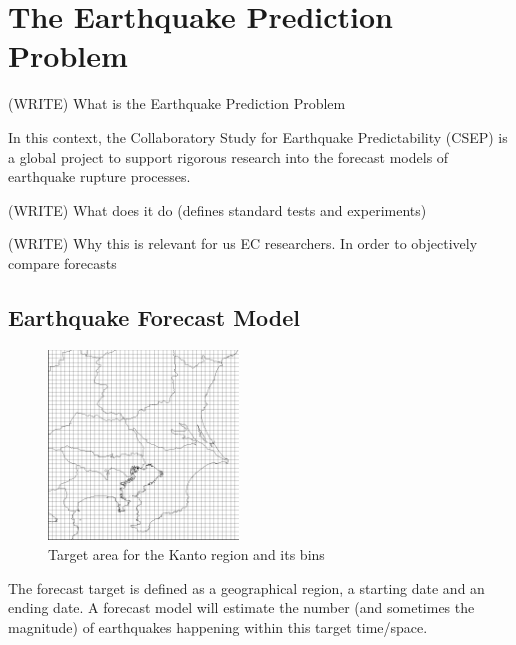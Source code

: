 \documentclass{sig-alternate}
\begin{document}
\section{The Earthquake Prediction Problem}





(WRITE) What is the Earthquake Prediction Problem

In this context, the Collaboratory Study for Earthquake Predictability
(CSEP) is a global project to support rigorous research into the
forecast models of earthquake rupture processes.  

(WRITE) What does it do (defines standard tests and experiments)

(WRITE) Why this is relevant for us EC researchers.
In order to objectively compare forecasts 

\subsection{Earthquake Forecast Model}\label{CSEP_definition} 

\begin{figure}
  \begin{center}
    \includegraphics[width=0.45\textwidth]{img/kantomap.png}
  \end{center}
  \caption{Target area for the Kanto region and its bins}
  \label{fig:kantomap}
\end{figure}

The forecast target is defined as a geographical region, a starting
date and an ending date. A forecast model will estimate the number
(and sometimes the magnitude) of earthquakes happening within this
target time/space.
\end{document}
